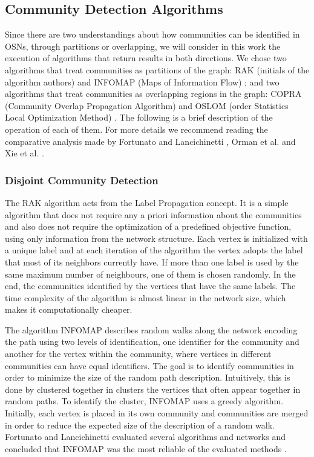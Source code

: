 \subsection{Community Detection Algorithms}
\label{sec:comm_algorithms}

Since there are two understandings about how communities can be identified in OSNs, through partitions or overlapping, we will consider in this work the execution of algorithms that return results in both directions. We chose two algorithms that treat communities as partitions of the graph: RAK (initials of the algorithm authors) \cite{Raghavan2007} and INFOMAP (Maps of Information Flow) \cite{Rosvall2008}; and two algorithms that treat communities as overlapping regions in the graph: COPRA (Community Overlap Propagation Algorithm) \cite{Gregory2010} and OSLOM (order Statistics Local Optimization Method) \cite{Lancichinetti2011}. The following is a brief description of the operation of each of them. For more details we recommend reading the comparative analysis made by Fortunato and Lancichinetti \cite{Lancichinetti2009a}, Orman et al. \cite{Orman2012} and Xie et al. \cite{Xie2013}.

\subsubsection*{Disjoint Community Detection}
\label{subsec:disjoint_comm_detection}

The RAK algorithm acts from the Label Propagation concept. It is a simple algorithm that does not require any a priori information about the communities and also does not require the optimization of a predefined objective function, using only information from the network structure. Each vertex is initialized with a unique label and at each iteration of the algorithm the vertex adopts the label that most of its neighbors currently have. If more than one label is used by the same maximum number of neighbours, one of them is chosen randomly. In the end, the communities identified by the vertices that have the same labels. The time complexity of the algorithm is almost linear in the network size, which makes it computationally cheaper.

The algorithm INFOMAP describes random walks along the network encoding the path using two levels of identification, one identifier for the community and another for the vertex within the community, where vertices in different communities can have equal identifiers. The goal is to identify communities in order to minimize the size of the random path description. Intuitively, this is done by clustered together in clusters the vertices that often appear together in random paths. To identify the cluster, INFOMAP uses a greedy algorithm. Initially, each vertex is placed in its own community and communities are merged in order to reduce the expected size of the description of a random walk. Fortunato and Lancichinetti evaluated several algorithms and networks and concluded that INFOMAP was the most reliable of the evaluated methods \cite{Lancichinetti2009a}.


